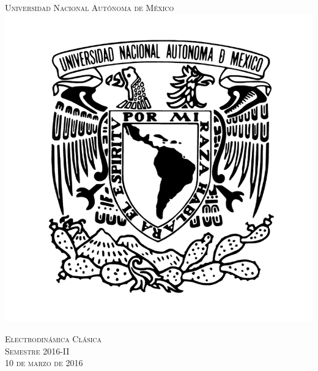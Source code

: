 \documentclass[a4paper,11pt]{article}
\numberwithin{equation}{section}
\begin{document}
\begin{titlepage}
\thispagestyle{fancy}

\newcommand{\HRule}{\rule{\linewidth}{0.5mm}} %

\center %
 

\textsc{\LARGE Universidad Nacional Autónoma de México}\\[0.3cm] %


\includegraphics[scale=0.17]{unam}


\textsc{\Large Electrodinámica Clásica}\\[0.3cm] %
\textsc{\large Semestre 2016-II}\\[0.3cm] %
\textsc{\large 10 de marzo de 2016}\\ %


\end{titlepage}
\end{document}
